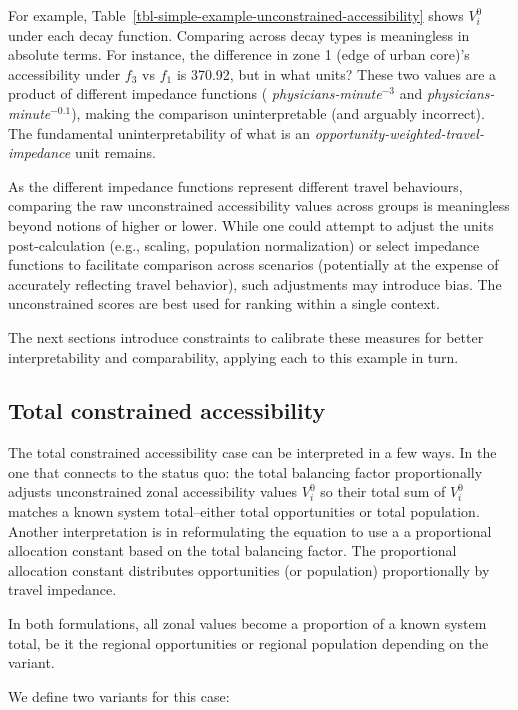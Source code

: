 \documentclass[
  10pt,
  letterpaper,
]{article}
\begin{document}
For example, Table~\ref{tbl-simple-example-unconstrained-accessibility}
shows \(V^0_{i}\) under each decay function. Comparing across decay
types is meaningless in absolute terms. For instance, the difference in
zone 1 (edge of urban core)'s accessibility under \(f_3\) vs \(f_1\) is
370.92, but in what units? These two values are a product of different
impedance functions ( \emph{physicians-minute\(^{-3}\)} and
\emph{physicians-minute\(^{-0.1}\)}), making the comparison
uninterpretable (and arguably incorrect). The fundamental
uninterpretability of what is an
\emph{opportunity-weighted-travel-impedance} unit remains.

As the different impedance functions represent different travel
behaviours, comparing the raw unconstrained accessibility values across
groups is meaningless beyond notions of higher or lower. While one could
attempt to adjust the units post-calculation (e.g., scaling, population
normalization) or select impedance functions to facilitate comparison
across scenarios (potentially at the expense of accurately reflecting
travel behavior), such adjustments may introduce bias. The unconstrained
scores are best used for ranking within a single context.

The next sections introduce constraints to calibrate these measures for
better interpretability and comparability, applying each to this example
in turn.

\subsection{Total constrained
accessibility}\label{total-constrained-accessibility}

The total constrained accessibility case can be interpreted in a few
ways. In the one that connects to the status quo: the total balancing
factor proportionally adjusts unconstrained zonal accessibility values
\(V^0_i\) so their total sum of \(V^0_i\) matches a known system
total--either total opportunities or total population. Another
interpretation is in reformulating the equation to use a a proportional
allocation constant based on the total balancing factor. The
proportional allocation constant distributes opportunities (or
population) proportionally by travel impedance.

In both formulations, all zonal values become a proportion of a known
system total, be it the regional opportunities or regional population
depending on the variant.

We define two variants for this case:
\end{document}
